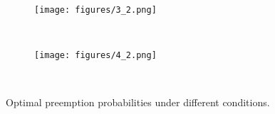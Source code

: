 \begin{figure}[h!]

    \centering
     \begin{subfigure}[b]{0.24\textwidth}
        \centering
        \texttt{[image: figures/3\_2.png]}
        \caption{$\frac{}{}$$\frac{}{}$$\frac{}{}$$\frac{}{}$$\frac{}{}$$\frac{}{}$ $\frac{}{}$$\frac{}{}$ $\frac{}{}$}
        \label{fig:theta}
    \end{subfigure}
    \hfill
    \begin{subfigure}[b]{0.24\textwidth}
        \centering
        \texttt{[image: figures/4\_2.png]}
        \caption{$\frac{}{}$$\frac{}{}$ $\frac{}{}$$\frac{}{}$$\frac{}{}$$\frac{}{}$ $\frac{}{}$$\frac{}{}$ $\frac{}{}$}
        \label{fig:div}
    \end{subfigure}   
\vspace{-15pt}
    \caption{Optimal preemption probabilities under different conditions.}
\vspace{-10pt}
    \label{mu_res}
\end{figure}












